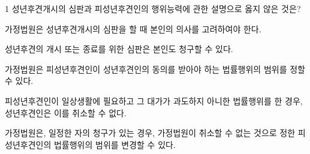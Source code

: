 \begin{question}{1}
성년후견개시의 심판과 피성년후견인의 행위능력에 관한 설명으로 옳지 않은 것은?
\begin{choices}
  \item 가정법원은 성년후견개시의 심판을 할 때 본인의 의사를 고려하여야 한다.
  \item 성년후견의 개시 또는 종료를 위한 심판은 본인도 청구할 수 있다.
  \item 가정법원은 피성년후견인이 성년후견인의 동의를 받아야 하는 법률행위의 범위를 정할 수 있다.
  \item 피성년후견인이 일상생활에 필요하고 그 대가가 과도하지 아니한 법률행위를 한 경우, 성년후견인은 이를 취소할 수 없다.
  \item 가정법원은, 일정한 자의 청구가 있는 경우, 가정법원이 취소할 수 없는 것으로 정한 피성년후견인의 법률행위의 범위를 변경할 수 있다.
\end{choices}
\end{question}
